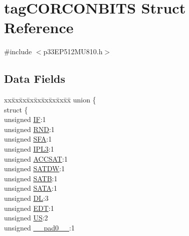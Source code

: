 \hypertarget{structtag_c_o_r_c_o_n_b_i_t_s}{}\section{tag\+C\+O\+R\+C\+O\+N\+B\+I\+TS Struct Reference}
\label{structtag_c_o_r_c_o_n_b_i_t_s}


{\ttfamily \#include $<$p33\+E\+P512\+M\+U810.\+h$>$}

\subsection*{Data Fields}
\begin{DoxyCompactItemize}
\item 
\begin{tabbing}
xx\=xx\=xx\=xx\=xx\=xx\=xx\=xx\=xx\=\kill
union \{\\
\>struct \{\\
\>\>unsigned \hyperlink{structtag_c_o_r_c_o_n_b_i_t_s_abe7a8d80dca90ef79b34831d56c21286}{IF}:1\\
\>\>unsigned \hyperlink{structtag_c_o_r_c_o_n_b_i_t_s_a3e53b677e608ee4b285eb85320fc0f19}{RND}:1\\
\>\>unsigned \hyperlink{structtag_c_o_r_c_o_n_b_i_t_s_a777f3c2435dc5f951cda63b21226a1a8}{SFA}:1\\
\>\>unsigned \hyperlink{structtag_c_o_r_c_o_n_b_i_t_s_a56c961f43dab719f979c839a01497de9}{IPL3}:1\\
\>\>unsigned \hyperlink{structtag_c_o_r_c_o_n_b_i_t_s_a7710a0f2688916fdbe04b48feac03dfe}{ACCSAT}:1\\
\>\>unsigned \hyperlink{structtag_c_o_r_c_o_n_b_i_t_s_a9da29e9f4f08c5f9f9fc9c34e982584d}{SATDW}:1\\
\>\>unsigned \hyperlink{structtag_c_o_r_c_o_n_b_i_t_s_aa8538d74582d36b9e8727189bda07b9a}{SATB}:1\\
\>\>unsigned \hyperlink{structtag_c_o_r_c_o_n_b_i_t_s_a8a97cef547c73ec08ae26047865c70a0}{SATA}:1\\
\>\>unsigned \hyperlink{structtag_c_o_r_c_o_n_b_i_t_s_a861e05c598e34636833ad19359e7fa5c}{DL}:3\\
\>\>unsigned \hyperlink{structtag_c_o_r_c_o_n_b_i_t_s_a4acbd442aaf3fec46a504eada6b53125}{EDT}:1\\
\>\>unsigned \hyperlink{structtag_c_o_r_c_o_n_b_i_t_s_a0203571435e0aefb8a2bf090b8fe6428}{US}:2\\
\>\>unsigned \hyperlink{structtag_c_o_r_c_o_n_b_i_t_s_adf71f3d8410c1f1dbbc96680a92c49af}{\_\_pad0\_\_}:1\\

\end{tabbing}
\end{DoxyCompactItemize}
